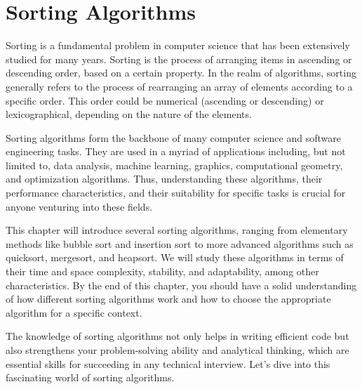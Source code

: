 \chapter{Sorting Algorithms}

Sorting is a fundamental problem in computer science that has been extensively studied for many years. Sorting is the process of arranging items in ascending or descending order, based on a certain property. In the realm of algorithms, sorting generally refers to the process of rearranging an array of elements according to a specific order. This order could be numerical (ascending or descending) or lexicographical, depending on the nature of the elements.

Sorting algorithms form the backbone of many computer science and software engineering tasks. They are used in a myriad of applications including, but not limited to, data analysis, machine learning, graphics, computational geometry, and optimization algorithms. Thus, understanding these algorithms, their performance characteristics, and their suitability for specific tasks is crucial for anyone venturing into these fields.

This chapter will introduce several sorting algorithms, ranging from elementary methods like bubble sort and insertion sort to more advanced algorithms such as quicksort, mergesort, and heapsort. We will study these algorithms in terms of their time and space complexity, stability, and adaptability, among other characteristics. By the end of this chapter, you should have a solid understanding of how different sorting algorithms work and how to choose the appropriate algorithm for a specific context.

The knowledge of sorting algorithms not only helps in writing efficient code but also strengthens your problem-solving ability and analytical thinking, which are essential skills for succeeding in any technical interview. Let's dive into this fascinating world of sorting algorithms.
